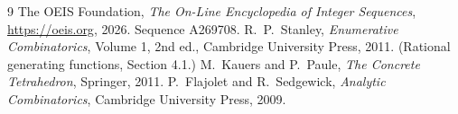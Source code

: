 \documentclass[11pt,a4paper]{article}
\theoremstyle{plain}
\theoremstyle{definition}
\begin{document}
\begin{thebibliography}{9}
 The OEIS Foundation, \emph{The On-Line Encyclopedia of Integer
Sequences}, \url{https://oeis.org}, 2026. Sequence A269708.
 R.~P.~Stanley, \emph{Enumerative Combinatorics}, Volume 1, 2nd ed.,
Cambridge University Press, 2011. (Rational generating functions, Section 4.1.)
 M.~Kauers and P.~Paule, \emph{The Concrete Tetrahedron}, Springer, 2011.
 P.~Flajolet and R.~Sedgewick, \emph{Analytic Combinatorics}, Cambridge
University Press, 2009.
\end{thebibliography}
\end{document}
